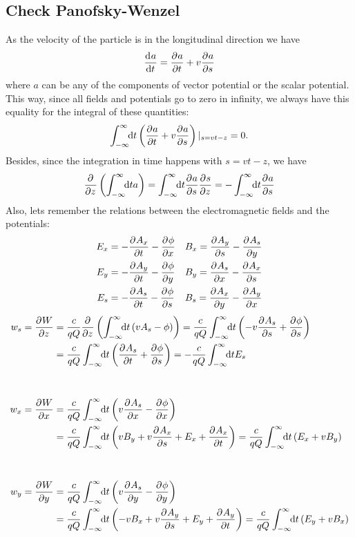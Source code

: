 \begin{apendicesenv}
    \chapter{Check Panofsky-Wenzel}\label{app:check_panofky}

    As the velocity of the particle is in the longitudinal direction we have
    \begin{align}
    	\frac{\mathrm{d}^{{}}a}{\mathrm{d} t^{{}}} = \frac{\partial^{{}}a}{\partial t^{{}}} + v\frac{\partial^{{}}a}{\partial s^{{}}}
    \end{align}
    where $a$ can be any of the components of vector potential or the scalar potential. This way, since all fields and potentials go to zero in infinity, we always have this equality for the integral of these quantities:
    \begin{align}
    	\int_{-\infty}^{\infty}\!\!\text{d}t \left(\frac{\partial^{{}}a}{\partial t^{{}}} + v\frac{\partial^{{}}a}{\partial s^{{}}}\right)|_{s=vt-z} = 0.
    \end{align}
    Besides, since the integration in time happens with $s=vt-z$, we have
    \begin{align}
    	\frac{\partial^{{}}}{\partial z^{{}}}\left(\int_{-\infty}^{\infty}\!\!\text{d}t a\right) =
    	\int_{-\infty}^{\infty}\!\!\text{d}t \frac{\partial^{{}}a}{\partial s^{{}}}\frac{\partial^{{}}s}{\partial z^{{}}} =
    	-\int_{-\infty}^{\infty}\!\!\text{d}t \frac{\partial^{{}}a}{\partial s^{{}}}
    \end{align}
    Also, lets remember the relations between the electromagnetic fields and the potentials:
    \begin{align}
    	E_x &= -\frac{\partial^{{}}A_x}{\partial t^{{}}} - \frac{\partial^{{}}\phi}{\partial x^{{}}} &
        	& B_x = \frac{\partial^{{}}A_y}{\partial s^{{}}} - \frac{\partial^{{}}A_s}{\partial y^{{}}}\\
    	E_y &= -\frac{\partial^{{}}A_y}{\partial t^{{}}} - \frac{\partial^{{}}\phi}{\partial y^{{}}} &
        	& B_y = \frac{\partial^{{}}A_s}{\partial x^{{}}} - \frac{\partial^{{}}A_x}{\partial s^{{}}}\\
    	E_s &= -\frac{\partial^{{}}A_s}{\partial t^{{}}} - \frac{\partial^{{}}\phi}{\partial s^{{}}} &
        	& B_s = \frac{\partial^{{}}A_x}{\partial y^{{}}} - \frac{\partial^{{}}A_y}{\partial x^{{}}}
    \end{align}
    \begin{align}
    	w_s = \derpar{W}{z}\nonumber
    	&= \frac{c}{qQ} \derpar{}{z}\left(\infint{t}{\left(vA_s-\phi\right)}\right)
    	= \frac{c}{qQ} \infint{t}{\left(-v\derpar{A_s}{s}+\derpar{\phi}{s}\right)}\\
    	&= \frac{c}{qQ} \infint{t}{\left(\derpar{A_s}{t}+\derpar{\phi}{s}\right)}
    	=-\frac{c}{qQ} \infint{t}{E_s}\\[1cm]
    	w_x = \derpar{W}{x}\nonumber
    	&=\frac{c}{qQ} \infint{t}{\left(v\derpar{A_s}{x}-\derpar{\phi}{x}\right)}\\
    	&= \frac{c}{qQ} \infint{t}{\left(vB_y+v\derpar{A_x}{s} + E_x + \derpar{A_x}{t}\right)}
    	= \frac{c}{qQ} \infint{t}{\left(E_x + vB_y\right)}\\[1cm]
    	w_y = \derpar{W}{y}\nonumber
    	&=\frac{c}{qQ} \infint{t}{\left(v\derpar{A_s}{y}-\derpar{\phi}{y}\right)}\\
    	&=\frac{c}{qQ} \infint{t}{\left(-vB_x+v\derpar{A_y}{s} + E_y + \derpar{A_y}{t}\right)}
    	= \frac{c}{qQ} \infint{t}{\left(E_y + vB_x\right)}
    \end{align}



\end{apendicesenv}
